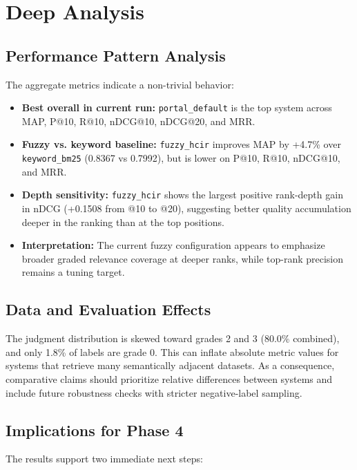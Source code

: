 \documentclass[11pt,a4paper]{article}
\begin{document}
\section{Deep Analysis}

\subsection{Performance Pattern Analysis}

The aggregate metrics indicate a non-trivial behavior:

\begin{itemize}[leftmargin=1.5em]
  \item \textbf{Best overall in current run:} \texttt{portal_default} is the top system across MAP, P@10, R@10, nDCG@10, nDCG@20, and MRR.
  \item \textbf{Fuzzy vs. keyword baseline:} \texttt{fuzzy_hcir} improves MAP by +4.7\% over \texttt{keyword_bm25} (0.8367 vs 0.7992), but is lower on P@10, R@10, nDCG@10, and MRR.
  \item \textbf{Depth sensitivity:} \texttt{fuzzy_hcir} shows the largest positive rank-depth gain in nDCG (+0.1508 from @10 to @20), suggesting better quality accumulation deeper in the ranking than at the top positions.
  \item \textbf{Interpretation:} The current fuzzy configuration appears to emphasize broader graded relevance coverage at deeper ranks, while top-rank precision remains a tuning target.
\end{itemize}

\subsection{Data and Evaluation Effects}

The judgment distribution is skewed toward grades 2 and 3 (80.0\% combined), and only 1.8\% of labels are grade 0. This can inflate absolute metric values for systems that retrieve many semantically adjacent datasets. As a consequence, comparative claims should prioritize relative differences between systems and include future robustness checks with stricter negative-label sampling.

\subsection{Implications for Phase 4}

The results support two immediate next steps:
\end{document}
